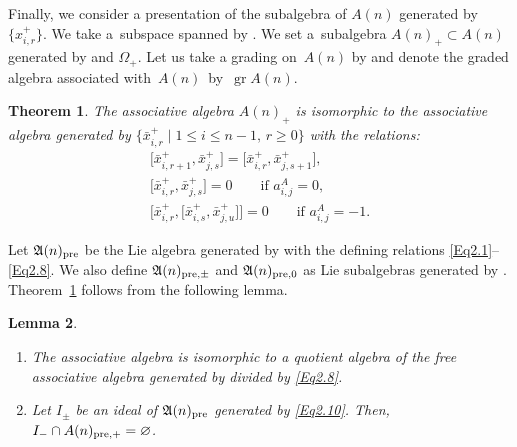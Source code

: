 \documentclass[10pt,a4paper]{amsart}
\numberwithin{equation}{section}
\newtheorem{Theorem}{Theorem}[section]
\newtheorem{Lemma}[Theorem]{Lemma}
\theoremstyle{definition}
\begin{document}
Finally, we consider a presentation of the subalgebra of $A(n)$ generated by $\bigl\{x^+_{i,r}\bigr\}$.
We take a~subspace  spanned by .
We set a~subalgebra $A(n)_+\subset A(n)$ generated by  and $\Omega_+$. Let us take a grading on~$A(n)$ by  and denote the graded algebra associated with~$A(n)$~by~$\operatorname{gr}A(n)$.
\begin{Theorem}\label{plus}
The associative algebra $A(n)_+$ is isomorphic to the associative algebra generated by $\bigl\{\bar{x}^+_{i,r}\mid 1\leq i\leq n-1,\,r\geq0\bigr\}$ with the relations:
\begin{gather*}
\bigl[\bar{x}^+_{i,r+1},\bar{x}^+_{j,s}\bigr]=\bigl[\bar{x}^+_{i,r},\bar{x}^+_{j,s+1}\bigr],\\
\bigl[\bar{x}^+_{i,r},\bar{x}^+_{j,s}\bigr]=0 \qquad \text{if }a^A_{i,j}=0,\\
\bigl[\bar{x}^+_{i,r},\bigl[\bar{x}^+_{i,s},\bar{x}^+_{j,u}\bigr]\bigr]=0 \qquad \text{if }a^A_{i,j}=-1.
\end{gather*}
\end{Theorem} %
Let $\mathfrak{A}(n)_{{\rm pre}}$ be the Lie algebra generated by  with the defining relations \eqref{Eq2.1}--\eqref{Eq2.8}. We also define $\mathfrak{A}(n)_{{\rm pre},\pm}$ and $\mathfrak{A}(n)_{{\rm pre},0}$ as Lie subalgebras generated by .
Theorem~\ref{plus} follows from the following lemma.
\begin{Lemma}\qquad
\begin{enumerate}\itemsep=0pt
\item[$(1)$] The associative algebra  is isomorphic to a quotient algebra of the free associative algebra generated by  divided by \eqref{Eq2.8}.

\item[$(2)$] Let $I_\pm$ be an ideal of $\mathfrak{A}(n)_{{\rm pre}}$ generated by \eqref{Eq2.10}. Then, $I_-\cap A(n)_{{\rm pre},+}=\varnothing$.
\end{enumerate}
\end{Lemma}
\end{document}
